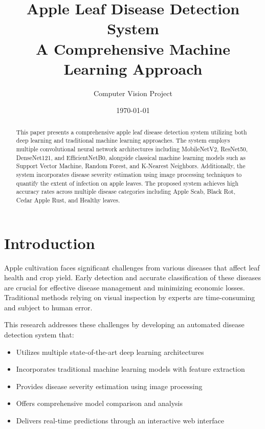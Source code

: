 \documentclass[11pt,a4paper]{article}
\title{\textbf{Apple Leaf Disease Detection System}\\
\large A Comprehensive Machine Learning Approach}
\author{Computer Vision Project}
\date{\today}
\begin{document}
\maketitle

\begin{abstract}
This paper presents a comprehensive apple leaf disease detection system utilizing both deep learning and traditional machine learning approaches. The system employs multiple convolutional neural network architectures including MobileNetV2, ResNet50, DenseNet121, and EfficientNetB0, alongside classical machine learning models such as Support Vector Machine, Random Forest, and K-Nearest Neighbors. Additionally, the system incorporates disease severity estimation using image processing techniques to quantify the extent of infection on apple leaves. The proposed system achieves high accuracy rates across multiple disease categories including Apple Scab, Black Rot, Cedar Apple Rust, and Healthy leaves.
\end{abstract}

\section{Introduction}
Apple cultivation faces significant challenges from various diseases that affect leaf health and crop yield. Early detection and accurate classification of these diseases are crucial for effective disease management and minimizing economic losses. Traditional methods relying on visual inspection by experts are time-consuming and subject to human error.

This research addresses these challenges by developing an automated disease detection system that:
\begin{itemize}
    \item Utilizes multiple state-of-the-art deep learning architectures
    \item Incorporates traditional machine learning models with feature extraction
    \item Provides disease severity estimation using image processing
    \item Offers comprehensive model comparison and analysis
    \item Delivers real-time predictions through an interactive web interface
\end{itemize}
\end{document}
